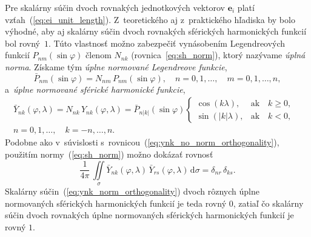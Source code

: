 \documentclass[a4paper, 12pt]{book}
\newcommand{\diff}{\mathrm d}
\let\vec\mathbf
\begin{document}
Pre skalárny súčin dvoch rovnakých jednotkových vektorov $\vec e_i$ platí 
vzťah~(\ref{eq:ei_unit_length}).  Z~teoretického aj z~praktického hľadiska by 
bolo výhodné, aby aj skalárny súčin dvoch rovnakých sférických harmonických 
funkcií bol rovný~$1$.  Túto vlastnosť možno zabezpečiť vynásobením 
Legendreových funkcií $P_{nm}(\sin\varphi)$ členom $N_{nk}$ 
(rovnica~\ref{eq:sh_norm}), ktorý nazývame \emph{úplná norma}.  Získame tým 
\emph{úplne normované Legendreove funkcie},
%
\begin{equation}
\bar{P}_{nm}(\sin\varphi) = N_{nm} \, P_{nm}(\sin\varphi){,} \quad  n = 0, 1, 
\dots,
\quad m = 0, 1, \dots, n{,}
\end{equation}
%
a~\emph{úplne normované sférické harmonické funkcie},
%
\begin{equation}
\label{eq:ynk_norm}
\begin{split}
\bar{Y}_{nk}(\varphi, \lambda) = N_{nk} \, Y_{nk}(\varphi, \lambda)
= \bar{P}_{n|k|}(\sin\varphi)
%
\begin{cases}
\cos(k\lambda){,}    &\text{ak} \quad k \geq 0{,}\\
\sin(|k|\lambda){,}  &\text{ak} \quad k < 0{,}
\end{cases}
&
%
\\
n = 0, 1, \dots, \quad k = -n, \dots, n{.}&
\end{split}
\end{equation}
%
Podobne ako v~súvislosti s~rovnicou~(\ref{eq:ynk_no_norm_orthogonality}), 
použitím normy~(\ref{eq:sh_norm}) možno dokázať rovnosť
%
\begin{equation}
\label{eq:ynk_norm_orthogonality}
\frac{1}{4\pi} \, \iint\limits_{\sigma} \bar{Y}_{nk}(\varphi, \lambda) \,
\bar{Y}_{rs}(\varphi, \lambda) \, \diff \sigma = \delta_{nr} \, \delta_{ks}{.}
\end{equation}
%
Skalárny súčin~(\ref{eq:ynk_norm_orthogonality}) dvoch rôznych úplne
normovaných sférických harmonických funkcií je teda rovný 0, zatiaľ čo skalárny
súčin dvoch rovnakých úplne normovaných sférických harmonických funkcií je
rovný $1$.
\end{document}

